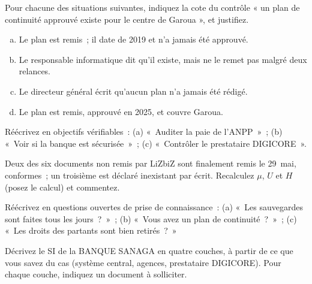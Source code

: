 \begin{boxexo}[title={\ding{45}\quad Exercice~8.2. Coter les absences \niveaubase}]
Pour chacune des situations suivantes, indiquez la cote du contrôle « un
plan de continuité approuvé existe pour le centre de Garoua », et
justifiez.
\begin{enumerate}[(a)]
    \item Le plan est remis~; il date de 2019 et n'a jamais été approuvé.
    \item Le responsable informatique dit qu'il existe, mais ne le remet pas
          malgré deux relances.
    \item Le directeur général écrit qu'aucun plan n'a jamais été rédigé.
    \item Le plan est remis, approuvé en 2025, et couvre Garoua.
\end{enumerate}
\end{boxexo}

\begin{boxexo}[title={\ding{45}\quad Exercice~8.3. Écrire des objectifs \niveaumoyen}]
Réécrivez en objectifs vérifiables~: (a) «~Auditer la paie de l'ANPP~»~;
(b) «~Voir si la banque est sécurisée~»~; (c) «~Contrôler le prestataire
DIGICORE~».
\end{boxexo}

\begin{boxexo}[title={\ding{45}\quad Exercice~8.4. Le cas des documents \niveaumoyen}]
Deux des six documents non remis par LiZbiZ sont finalement remis le
29~mai, conformes~; un troisième est déclaré inexistant par écrit.
Recalculez $\mu$, $U$ et $H$ (posez le calcul) et commentez.
\end{boxexo}

\begin{boxexo}[title={\ding{45}\quad Exercice~8.5. Une question suggestive \niveaumoyen}]
Réécrivez en questions ouvertes de prise de connaissance~: (a) «~Les
sauvegardes sont faites tous les jours~?~»~; (b) «~Vous avez un plan de
continuité~?~»~; (c) «~Les droits des partants sont bien retirés~?~»
\end{boxexo}

\begin{boxexo}[title={\ding{45}\quad Exercice~8.6. Les couches de la BANQUE SANAGA \niveaumoyen}]
Décrivez le SI de la BANQUE SANAGA en quatre couches, à partir de ce que
vous savez du cas (système central, agences, prestataire DIGICORE). Pour
chaque couche, indiquez un document à solliciter.
\end{boxexo}

